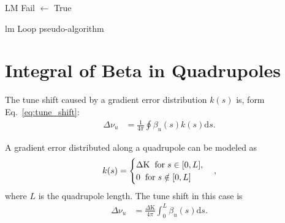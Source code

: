 \begin{algorithm}[h!]
\SetAlgoLined
{}
LM Fail $\leftarrow$ True\\
 \caption{\gls{lm} Loop pseudo-algorithm}
 \label{algo:lm_loop}
\end{algorithm}

\chapter{Integral of Beta in Quadrupoles}\label{appendix:beta}
The tune shift caused by a gradient error distribution $k(s)$ is, form Eq.~\eqref{eq:tune_shift}:
\begin{align}
    \Delta\nu_u &= \frac{1}{4\pi} \oint \beta_u(s) k(s) \mathrm{d}s.
\end{align}

A gradient error distributed along a quadrupole can be modeled as
\begin{equation}
    k(s) = 
\begin{cases}
\Delta \mathrm{K} \hspace{0.2cm} \text{for} \hspace{0.1cm} s \in [0, L], \\
0 \hspace{0.2cm} \text{for} \hspace{0.1cm} s \notin [0, L]
\end{cases},
\end{equation}
where $L$ is the quadrupole length. The tune shift in this case is
\begin{align}
    \Delta\nu_u &= \frac{\Delta \mathrm{K}}{4\pi} \int_{0}^{L} \beta_u(s)\mathrm{d}s.
\end{align}

